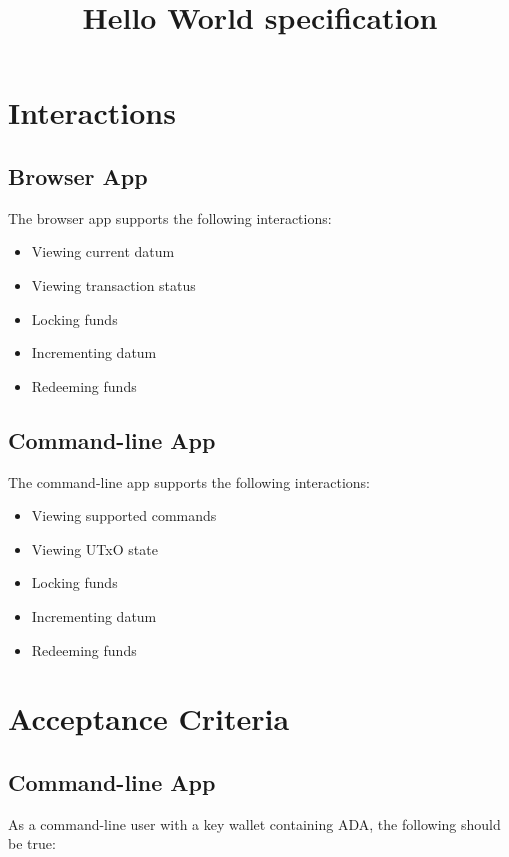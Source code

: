 \documentclass{article}
\title{Hello World specification}
\begin{document}
\maketitle

\section{Interactions}

\subsection{Browser App}

The browser app supports the following interactions:

\begin{itemize}
  \item Viewing current datum
  \item Viewing transaction status 
  \item Locking funds
  \item Incrementing datum
  \item Redeeming funds
\end{itemize}

\subsection{Command-line App}

The command-line app supports the following interactions:

\begin{itemize}
  \item Viewing supported commands
  \item Viewing UTxO state 
  \item Locking funds
  \item Incrementing datum
  \item Redeeming funds
\end{itemize}


\section{Acceptance Criteria}

\subsection{Command-line App}

As a command-line user with a key wallet containing ADA, the following should be true:
\end{document}
